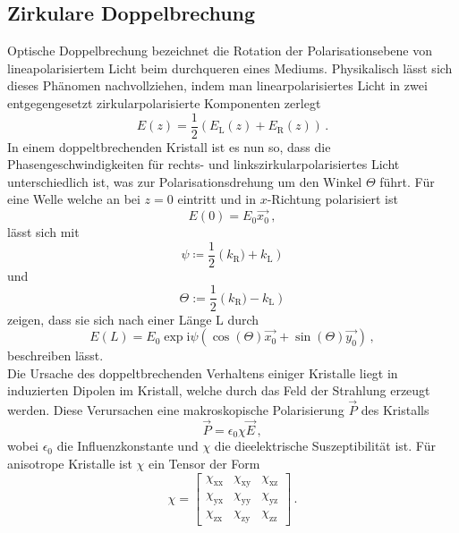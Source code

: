 \subsection{Zirkulare Doppelbrechung}
Optische Doppelbrechung bezeichnet die Rotation der Polarisationsebene von lineapolarisiertem Licht beim durchqueren eines Mediums. Physikalisch lässt sich dieses Phänomen nachvollziehen, indem man linearpolarisiertes Licht in zwei entgegengesetzt zirkularpolarisierte Komponenten zerlegt
\begin{equation}
E(z)=\frac{1}{2}(E_\text{L}(z)+E_\text{R}(z))\,.
\end{equation}
In einem doppeltbrechenden Kristall ist es nun so, dass die Phasengeschwindigkeiten für rechts- und linkszirkularpolarisiertes Licht unterschiedlich ist, was zur Polarisationsdrehung um den Winkel $\Theta$ führt. Für eine Welle welche an bei $z=0$ eintritt und in $x$-Richtung polarisiert ist
\begin{equation}
  E(0)=E_0\vec{x_0}\,,
\end{equation}
lässt sich mit
\begin{equation}
  \psi\coloneqq\frac{1}{2}\left(k_\text{R})+k_\text{L}\right)
\end{equation}
und
\begin{equation}
\Theta:=\frac{1}{2}\left(k_\text{R})-k_\text{L}\right)
\label{eq:theta}
\end{equation}
zeigen, dass sie sich nach einer Länge L durch
\begin{equation}
E(L)=E_0\exp{\text{i}\psi}\left(\cos(\Theta)\vec{x_0}+\sin(\Theta)\vec{y_0}\right)\,,
\end{equation}
beschreiben lässt.\\
Die Ursache des doppeltbrechenden Verhaltens einiger Kristalle liegt in induzierten Dipolen im Kristall, welche durch das Feld der Strahlung erzeugt werden. Diese Verursachen eine makroskopische Polarisierung $\vec{P}$ des Kristalls
\begin{equation}
\vec{P}=\epsilon_0\chi\vec{E}\,,
\end{equation}
wobei $\epsilon_0$ die Influenzkonstante und $\chi$ die dieelektrische Suszeptibilität ist.
Für anisotrope Kristalle ist $\chi$ ein Tensor der Form
\begin{equation}
  \chi=
  \left[ {\begin{array}{ccc}
   \chi_\text{xx} & \chi_\text{xy} & \chi_\text{xz}\\
   \chi_\text{yx} & \chi_\text{yy} & \chi_\text{yz}\\
   \chi_\text{zx} & \chi_\text{zy} &\chi_\text{zz}
  \end{array} } \right]\,.
\end{equation}
